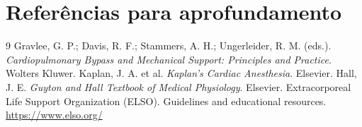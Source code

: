 \documentclass[11pt,a4paper,oneside]{book}
\begin{document}
\chapter*{Referências para aprofundamento}
\begin{thebibliography}{9}
 Gravlee, G. P.; Davis, R. F.; Stammers, A. H.; Ungerleider, R. M. (eds.). \textit{Cardiopulmonary Bypass and Mechanical Support: Principles and Practice}. Wolters Kluwer.
 Kaplan, J. A. et al. \textit{Kaplan's Cardiac Anesthesia}. Elsevier.
 Hall, J. E. \textit{Guyton and Hall Textbook of Medical Physiology}. Elsevier.
 Extracorporeal Life Support Organization (ELSO). Guidelines and educational resources. \url{https://www.elso.org/}
\end{thebibliography}
\end{document}
